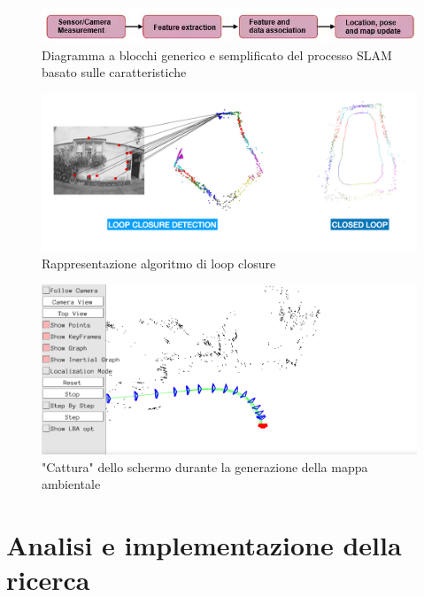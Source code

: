 \documentclass[12pt,a4paper]{report}
\begin{document}
\begin{figure}[H]
    \centering
    \includegraphics[width=1\linewidth]{img/SLAM_schema.jpg}
    \caption{Diagramma a blocchi generico e semplificato del processo SLAM basato sulle caratteristiche \cite{SLAM_algoritm2}}
\end{figure}

\begin{figure}[H]
    \centering
    \includegraphics[width=1\linewidth]{img/loop_closure.png}
    \caption{Rappresentazione algoritmo di loop closure \cite{loop_closure}}
    
\end{figure}

\begin{figure}[H]
    \centering
    \includegraphics[width=1\linewidth]{img/map_viewer.png}
    \caption{"Cattura" dello schermo durante la generazione della mappa ambientale}
\end{figure}




\chapter{Analisi e implementazione della ricerca}
\end{document}
